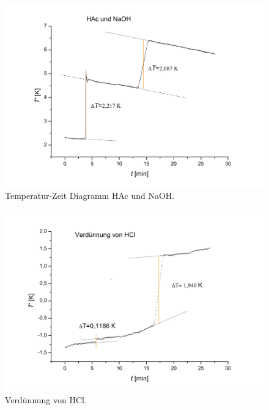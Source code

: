 \documentclass[12pt,a4paper,titlepage,headinclude,bibtotoc]{scrartcl}
\begin{document}
\begin{figure}[h] \label{HAcundNaOH}
\centering
\includegraphics[width=13.5cm]{HAcundNaOH.png}
\caption{Temperatur-Zeit Diagramm HAc und NaOH.}
\end{figure} 
\FloatBarrier

\begin{figure}[h]\label{Verduennung}
\centering
\includegraphics[width=13.5cm]{Verduennungsenthalpie.png}
\caption{Verdünnung von HCl.}
\end{figure} 
\FloatBarrier
\end{document}
